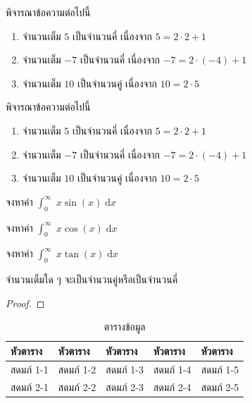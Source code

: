 \begin{content}
\begin{example}
พิจารณาข้อความต่อไปนี้
\begin{enumerate}
	\item จำนวนเต็ม $5$ เป็นจำนวนคี่ เนื่องจาก $5 = 2\cdot 2 + 1$
	\item จำนวนเต็ม $-7$ เป็นจำนวนคี่ เนื่องจาก $-7 = 2\cdot (-4) + 1$
	\item จำนวนเต็ม $10$ เป็นจำนวนคู่ เนื่องจาก $10 = 2\cdot 5$
\end{enumerate}
\end{example}

\begin{example}
พิจารณาข้อความต่อไปนี้
\begin{enumerate}
	\item จำนวนเต็ม $5$ เป็นจำนวนคี่ เนื่องจาก $5 = 2\cdot 2 + 1$
	\item จำนวนเต็ม $-7$ เป็นจำนวนคี่ เนื่องจาก $-7 = 2\cdot (-4) + 1$
	\item จำนวนเต็ม $10$ เป็นจำนวนคู่ เนื่องจาก $10 = 2\cdot 5$
\end{enumerate}
\end{example}


\begin{example}
จงหาค่า $\displaystyle\int_{0}^{\infty}\;x\sin(x) \;\mathrm{d}x$
\vspace{3cm}
\end{example}

\begin{example}
จงหาค่า $\displaystyle\int_{0}^{\infty}\;x\cos(x) \;\mathrm{d}x$
\vspace{6cm}
\end{example}

\begin{example}
จงหาค่า $\displaystyle\int_{0}^{\infty}\;x\tan(x) \;\mathrm{d}x$
\vspace{9cm}
\end{example}

\begin{theorem}
จำนวนเต็มใด ๆ จะเป็นจำนวนคู่หรือเป็นจำนวนคี่
\end{theorem}
\begin{proof}
\end{proof}


\begin{table}[h]
\centering
\begin{tabular}{|l|l|l|l|l|}
\hline
หัวตาราง & หัวตาราง & หัวตาราง & หัวตาราง & หัวตาราง \\ \hline
สดมภ์ 1-1 & สดมภ์ 1-2 & สดมภ์ 1-3 & สดมภ์ 1-4 & สดมภ์ 1-5  \\ \hline
สดมภ์ 2-1 & สดมภ์ 2-2 & สดมภ์ 2-3 & สดมภ์ 2-4 & สดมภ์ 2-5  \\ \hline
\end{tabular}
\caption{ตารางข้อมูล}
\end{table}


\end{content}
